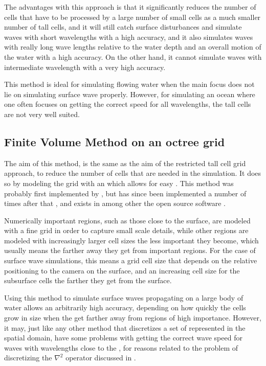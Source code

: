 The advantages with this approach is that it significantly reduces the number of cells that have to be processed by \approximating a large number of small cells as a much smaller number of tall cells, and it will still catch surface disturbances and simulate waves with short wavelengths with a high accuracy, and it also simulates waves with really long wave lengths relative to the water depth and an overall motion of the water with a high accuracy. On the other hand, it cannot simulate waves with intermediate wavelength with a very high accuracy.

This method is ideal for simulating flowing water when the main focus does not lie on simulating surface wave properly. However, for simulating an ocean where one often focuses on getting the correct speed for all wavelengths, the tall cells are not very well suited.

\subsection{Finite Volume Method on an octree grid}

The aim of this method, is the same as the aim of the restricted tall cell grid approach, to reduce the number of cells that are needed in the simulation. It does so by modeling the grid with an \octree which allows for easy . This method was probably first implemented by \citet{Popinet2003}, but has since been implemented a number of times after that \citep[e.g][]{Losasso2004}, and exists in among other the open source software \OpenFOAM.

Numerically important regions, such as those close to the surface, are modeled with a fine grid in order to capture small scale details, while other regions are modeled with increasingly larger cell sizes the less important they become, which usually means the farther away they get from important regions. For the case of surface wave simulations, this means a grid cell size that depends on the relative positioning to the camera on the surface, and an increasing cell size for the subsurface cells the farther they get from the surface.

Using this method to simulate surface waves propagating on a large body of water allows an arbitrarily high accuracy, depending on how quickly the cells grow in size when the get farther away from regions of high importance. However, it may, just like any other method that discretizes a set of \PDEs represented in the spatial domain, have some problems with getting the correct wave speed for waves with wavelengths close to the , for reasons related to the problem of discretizing the $\nabla^2$ operator discussed in .

